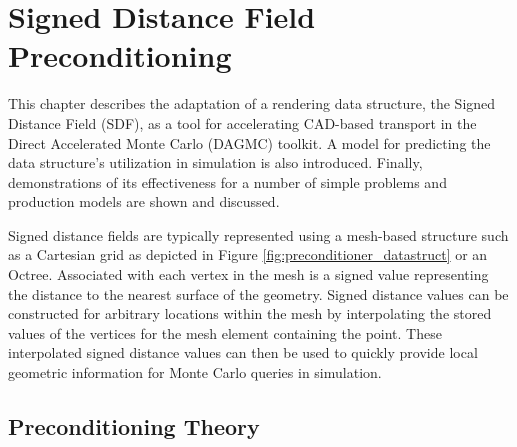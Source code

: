 

\newcommand{\precondQuery}[4] {
  \null %
  \subsection{#1}\label{subsec:#1}
  \begin{adjustwidth}{1em}{0pt}
    \begin{figure}[h]
      \begin{center}
        {width=0.65\textwidth}
        \caption[Depiction of SDF usage for the \textit{#1} geometry query.]{#3}
        \label{fig:#2}
      \end{center}
    \end{figure}
    #4
  \end{adjustwidth}
}

\newcommand{\sdfModel}[2] {
  \null %
  \textbf{\uppercase{#1}} 
  \begin{adjustwidth}{2.5em}{0pt}
    #2
  \end{adjustwidth}
  \null
}

\chapter{Signed Distance Field Preconditioning}\label{ch:preconditioning}

This chapter describes the adaptation of a rendering data structure, the Signed
Distance Field (SDF), as a tool for accelerating CAD-based transport in the Direct
Accelerated Monte Carlo (DAGMC) toolkit. A model for predicting the data
structure's utilization in simulation is also introduced. Finally,
demonstrations of its effectiveness for a number of simple problems and
production models are shown and discussed.

Signed distance fields are typically represented using a mesh-based structure
such as a Cartesian grid as depicted in Figure
\ref{fig:preconditioner_datastruct} or an Octree. Associated with each vertex in
the mesh is a signed value representing the distance to the nearest surface of
the geometry. Signed distance values can be constructed for arbitrary locations
within the mesh by interpolating the stored values of the vertices for the mesh
element containing the point. These interpolated signed distance values can then
be used to quickly provide local geometric information for Monte Carlo queries
in simulation.

\section{Preconditioning Theory}\label{sec:preconditioner_theory}

